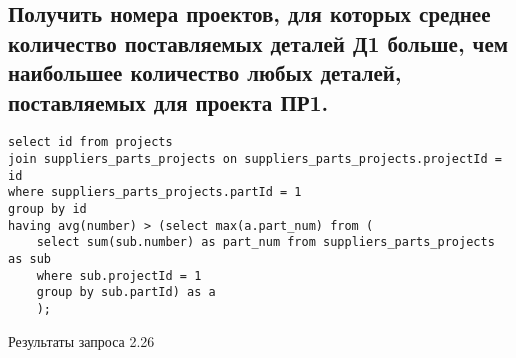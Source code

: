 \documentclass[a4paper,8pt]{article}
\begin{document}
\subsection{Получить номера проектов, для которых среднее количество поставляемых деталей Д1 больше, чем наибольшее количество любых деталей, поставляемых для проекта ПР1.}
\begin{verbatim}
select id from projects
join suppliers_parts_projects on suppliers_parts_projects.projectId = id
where suppliers_parts_projects.partId = 1
group by id
having avg(number) > (select max(a.part_num) from (
	select sum(sub.number) as part_num from suppliers_parts_projects as sub
    where sub.projectId = 1
    group by sub.partId) as a
    );
\end{verbatim}
\begin{table}[H]
\centering

\caption{Результаты запроса 2.26}
\end{table}
\end{document}
